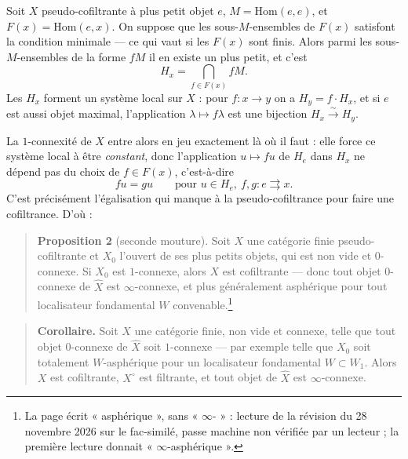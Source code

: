 \documentclass[11pt,a4paper]{article}
\begin{document}
Soit $X$ pseudo-cofiltrante à plus petit objet $e$, $M = \mathrm{Hom}(e,e)$,
et $F(x) = \mathrm{Hom}(e,x)$. On suppose que les sous-$M$-ensembles de $F(x)$
satisfont la condition minimale — ce qui vaut si les $F(x)$ sont finis. Alors
parmi les sous-$M$-ensembles de la forme $fM$ il en existe un plus petit, et
c'est
\[
  H_{x} = \bigcap_{f \in F(x)} fM .
\]
Les $H_{x}$ forment un système local sur $X$ : pour $f : x \to y$ on a
$H_{y} = f \cdot H_{x}$, et si $e$ est aussi objet maximal, l'application
$\lambda \mapsto f\lambda$ est une bijection $H_{x} \xrightarrow{\sim} H_{y}$.

La $1$-connexité de $X$ entre alors en jeu exactement là où il faut : elle
force ce système local à être \emph{constant}, donc l'application
$u \mapsto fu$ de $H_{e}$ dans $H_{x}$ ne dépend pas du choix de
$f \in F(x)$, c'est-à-dire
\[
  fu = gu \qquad \text{pour } u \in H_{e},\ f, g : e \rightrightarrows x .
\]
C'est précisément l'égalisation qui manque à la pseudo-cofiltrance pour faire
une cofiltrance. D'où :

\begin{quote}
\textbf{Proposition 2} (seconde mouture). Soit $X$ une catégorie finie
pseudo-cofiltrante et $X_{0}$ l'ouvert de ses plus petits objets, qui est non
vide et $0$-connexe. Si $X_{0}$ est $1$-connexe, alors $X$ est cofiltrante —
donc tout objet $0$-connexe de $\widehat{X}$ est $\infty$-connexe, et plus
généralement asphérique pour tout localisateur fondamental $W$
convenable.\footnote{La page écrit « asphérique », sans « $\infty$- » : lecture
de la révision du 28 novembre 2026 sur le fac-similé, passe machine non
vérifiée par un lecteur ; la première lecture donnait
« $\infty$-asphérique ».}
\end{quote}

\begin{quote}
\textbf{Corollaire.} Soit $X$ une catégorie finie, non vide et connexe, telle que tout objet
$0$-connexe de $\widehat{X}$ soit $1$-connexe — par exemple telle que $X_{0}$
soit totalement $W$-asphérique pour un localisateur fondamental
$W \subset W_{1}$. Alors $X$ est cofiltrante, $X^{\circ}$ est filtrante, et
tout objet de $\widehat{X}$ est $\infty$-connexe.
\end{quote}
\end{document}
